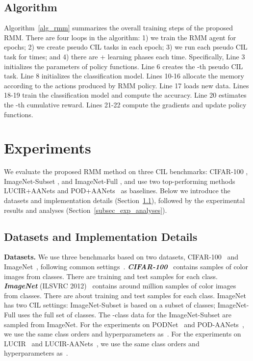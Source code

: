 \documentclass{article}
\newcommand{\myparagraph}[1]{\vspace{0.1em}\noindent\textbf{#1}}
\begin{document}
\subsection{Algorithm}
\label{subsec_algo}
Algorithm~\ref{alg_rmm} summarizes the overall training steps of the proposed RMM. 
There are four loops in the algorithm: 1) we train the RMM agent for  epochs; 2) we create  pseudo CIL tasks in each epoch; 3) we run each pseudo CIL task for  times; and 4) there are + learning phases each time. Specifically, Line 3 initializes the parameters of policy functions. Line 6 creates the -th pseudo CIL task. Line 8 initializes the classification model. Lines 10-16 allocate the memory according to the actions produced by RMM policy. Line 17 loads new data. Lines 18-19 train the classification model and compute the accuracy. Line 20 estimates the -th cumulative reward. Lines 21-22 compute the gradients and update policy functions.
 \section{Experiments}
\label{sec_exp}

We evaluate the proposed RMM method on three CIL benchmarks: CIFAR-100 \cite{krizhevsky2009learning}, ImageNet-Subset \cite{rebuffi2017icarl}, and ImageNet-Full \cite{russakovsky2015imagenet}, and use two top-performing methods LUCIR+AANets and POD+AANets~\cite{Liu2020AANets} as baselines.
Below we introduce the datasets and implementation details (Section~\ref{subsec_datasets}), followed by the experimental results and analyses (Section~\ref{subsec_exp_analyses}).

\subsection{Datasets and Implementation Details}
\label{subsec_datasets}

\myparagraph{Datasets.}
We use three benchmarks based on two datasets, CIFAR-100~\cite{krizhevsky2009learning} and ImageNet~\cite{russakovsky2015imagenet}, following common settings~\cite{douillard2020podnet,hou2019lucir,rebuffi2017icarl,Liu2020AANets}. 
\textbf\emph{{CIFAR-100}}~\cite{krizhevsky2009learning} contains  samples of  color images from  classes. There are  training and  test samples for each class.
\textbf\emph{{ImageNet}} (ILSVRC 2012)~\cite{russakovsky2015imagenet} contains around  million
samples of  color images from  classes. There are about  training and  test samples for each class. 
ImageNet has two CIL settings: ImageNet-Subset is based on a subset of  classes; ImageNet-Full uses the full set of  classes. 
The -class data for the ImageNet-Subset
are sampled from ImageNet. For the experiments on PODNet~\cite{douillard2020podnet} and POD-AANets~\cite{Liu2020AANets}, we use the same class orders and hyperparameters as~\cite{douillard2020podnet}. For the experiments on LUCIR~\cite{hou2019lucir} and LUCIR-AANets~\cite{Liu2020AANets}, we use the same class orders and hyperparameters as~\cite{hou2019lucir}.
\end{document}
